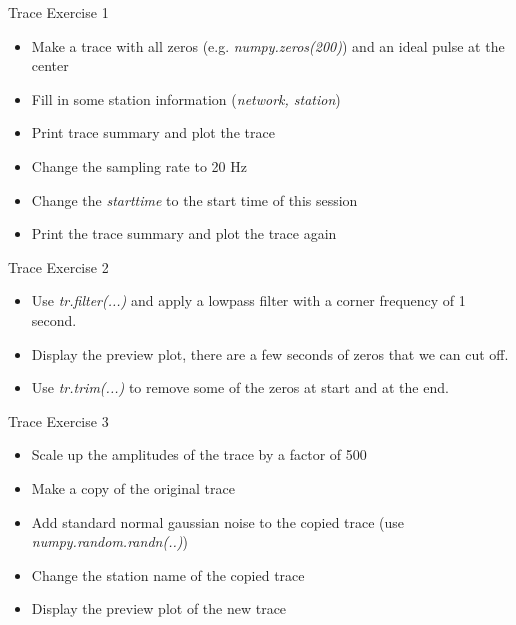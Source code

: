\documentclass[handout]{beamer}
\begin{document}
\begin{frame}{Trace Exercise 1}
    \begin{itemize}
        \item Make a trace with all zeros (e.g. \textit{numpy.zeros(200)}) and an ideal pulse at the center
        \item Fill in some station information (\textit{network, station})
        \item Print trace summary and plot the trace
        \item Change the sampling rate to 20 Hz
        \item Change the \textit{starttime} to the start time of this session
        \item Print the trace summary and plot the trace again
    \end{itemize}
\end{frame}

\begin{frame}{Trace Exercise 2}
    \begin{itemize}
        \item Use \textit{tr.filter(...)} and apply a lowpass filter with a corner frequency of 1 second.
        \item Display the preview plot, there are a few seconds of zeros that we can cut off.
        \item Use \textit{tr.trim(...)} to remove some of the zeros at start and at the end.
    \end{itemize}
\end{frame}


\begin{frame}{Trace Exercise 3}
    \begin{itemize}
        \item Scale up the amplitudes of the trace by a factor of 500
        \item Make a copy of the original trace
        \item Add standard normal gaussian noise to the copied trace (use \textit{numpy.random.randn(..)})
        \item Change the station name of the copied trace
        \item Display the preview plot of the new trace
    \end{itemize}
\end{frame}
\end{document}
